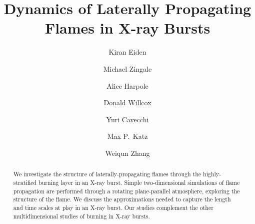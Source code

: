 \documentclass[preprint,times,tighten]{aastex63}
\begin{document}
\title{Dynamics of Laterally Propagating Flames in X-ray Bursts}


\author[0000-0001-6191-4285]{Kiran Eiden}

\author[0000-0001-8401-030X]{Michael Zingale}

\author[0000-0002-1530-781X]{Alice Harpole}

\author[0000-0003-2300-5165]{Donald Willcox}

\author{Yuri Cavecchi}

\author[0000-0003-0439-4556]{Max P.\ Katz}

\author[0000-0001-8092-1974]{Weiqun Zhang}




\begin{abstract}
We investigate the structure of laterally-propagating flames through
the highly-stratified burning layer in an X-ray burst.  Simple
two-dimensional simulations of flame propagation are performed through
a rotating plane-parallel atmosphere, exploring the structure of the
flame.  We discuss the approximations needed to capture the length and
time scales at play in an X-ray burst.  Our studies complement the
other multidimensional studies of burning in X-ray bursts.
\end{abstract}


\end{document}
